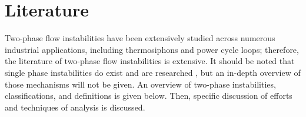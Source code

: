 \section{Literature}
Two-phase flow instabilities have been extensively studied across numerous industrial applications, including thermosiphons and power cycle loops; therefore, the literature of two-phase flow instabilities is extensive.
It should be noted that single phase instabilities do exist and are researched \cite{satoh_instability_1998}, but an in-depth overview of those mechanisms will not be given.
An overview of two-phase instabilities, classifications, and definitions is given below.
Then, specific discussion of efforts and techniques of analysis is discussed.


\newpage




